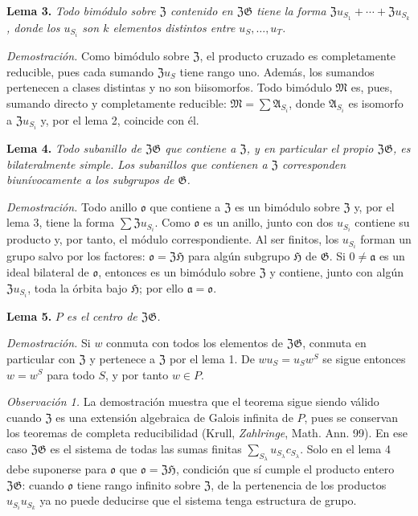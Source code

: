 \noindent\textbf{Lema 3.} \emph{Todo bimódulo sobre $\mathfrak Z$ contenido en $\mathfrak Z\mathfrak G$ tiene la forma $\mathfrak Zu_{S_1}+\cdots+\mathfrak Zu_{S_k}$, donde los $u_{S_i}$ son $k$ elementos distintos entre $u_S,\ldots,u_T$.}

\noindent\emph{Demostración.} Como bimódulo sobre $\mathfrak Z$, el producto cruzado es completamente reducible, pues cada sumando $\mathfrak Zu_S$ tiene rango uno. Además, los sumandos pertenecen a clases distintas y no son biisomorfos. Todo bimódulo $\mathfrak M$ es, pues, sumando directo y completamente reducible: $\mathfrak M=\sum\mathfrak A_{S_i}$, donde $\mathfrak A_{S_i}$ es isomorfo a $\mathfrak Zu_{S_i}$ y, por el lema 2, coincide con él.

\noindent\textbf{Lema 4.} \emph{Todo subanillo de $\mathfrak Z\mathfrak G$ que contiene a $\mathfrak Z$, y en particular el propio $\mathfrak Z\mathfrak G$, es bilateralmente simple. Los subanillos que contienen a $\mathfrak Z$ corresponden biunívocamente a los subgrupos de $\mathfrak G$.}

\noindent\emph{Demostración.} Todo anillo $\mathfrak o$ que contiene a $\mathfrak Z$ es un bimódulo sobre $\mathfrak Z$ y, por el lema 3, tiene la forma $\sum\mathfrak Zu_{S_i}$. Como $\mathfrak o$ es un anillo, junto con dos $u_{S_i}$ contiene su producto y, por tanto, el módulo correspondiente. Al ser finitos, los $u_{S_i}$ forman un grupo salvo por los factores: $\mathfrak o=\mathfrak Z\mathfrak H$ para algún subgrupo $\mathfrak H$ de $\mathfrak G$. Si $0\ne\mathfrak a$ es un ideal bilateral de $\mathfrak o$, entonces es un bimódulo sobre $\mathfrak Z$ y contiene, junto con algún $\mathfrak Zu_{S_i}$, toda la órbita bajo $\mathfrak H$; por ello $\mathfrak a=\mathfrak o$.

\noindent\textbf{Lema 5.} \emph{$P$ es el centro de $\mathfrak Z\mathfrak G$.}

\noindent\emph{Demostración.} Si $w$ conmuta con todos los elementos de $\mathfrak Z\mathfrak G$, conmuta en particular con $\mathfrak Z$ y pertenece a $\mathfrak Z$ por el lema 1. De $wu_S=u_Sw^S$ se sigue entonces $w=w^S$ para todo $S$, y por tanto $w\in P$.

\noindent\emph{Observación 1.} La demostración muestra que el teorema sigue siendo válido cuando $\mathfrak Z$ es una extensión algebraica de Galois infinita de $P$, pues se conservan los teoremas de completa reducibilidad (Krull, \emph{Zahlringe}, Math. Ann. 99). En ese caso $\mathfrak Z\mathfrak G$ es el sistema de todas las sumas finitas $\sum_{S_\lambda}u_{S_\lambda}c_{S_\lambda}$. Solo en el lema 4 debe suponerse para $\mathfrak o$ que $\mathfrak o=\mathfrak Z\mathfrak H$, condición que sí cumple el producto entero $\mathfrak Z\mathfrak G$: cuando $\mathfrak o$ tiene rango infinito sobre $\mathfrak Z$, de la pertenencia de los productos $u_{S_i}u_{S_k}$ ya no puede deducirse que el sistema tenga estructura de grupo.


